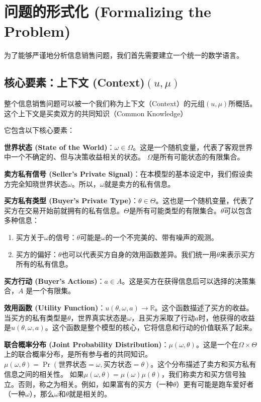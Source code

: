 \section{问题的形式化 (Formalizing the Problem)}

为了能够严谨地分析信息销售问题，我们首先需要建立一个统一的数学语言。

\subsection{核心要素：上下文 (Context)$(u,\mu)$}

整个信息销售问题可以被一个我们称为上下文（Context）的元组$(u, \mu)$所概括。这个上下文是买卖双方的共同知识（Common Knowledge）

它包含以下核心要素：

\textbf{世界状态 (State of the World)}：$\omega \in \Omega$。这是一个随机变量，代表了客观世界中一个不确定的、但与决策收益相关的状态。
$\Omega$是所有可能状态的有限集合。

\textbf{卖方私有信号 (Seller's Private Signal)}：在本模型的基本设定中，我们假设卖方完全知晓世界状态$\omega$。所以，$\omega$就是卖方的私有信息。

\textbf{买方私有类型 (Buyer's Private Type)}：$\theta \in \Theta$。这也是一个随机变量，代表了买方在交易开始前就拥有的私有信息。$\Theta$是所有可能类型的有限集合。$\theta$可以包含多种信息：
\begin{enumerate}
    \item 买方关于$\omega$的信号：$\theta$可能是$\omega$的一个不完美的、带有噪声的观测。
    \item 买方的偏好：$\theta$也可以代表买方自身的效用函数差异。我们统一用$\theta$来表示买方所有的私有信息。
\end{enumerate}

\textbf{买方行动 (Buyer's Actions)}：$a\in A$。这是买方在获得信息后可以选择的决策集合，$A$ 是一个有限集。

\textbf{效用函数 (Utility Function)}：$u(\theta, \omega, a) \to \mathbb{R}$。这个函数描述了买方的收益。当买方的私有类型是$\theta$，世界真实状态是$\omega$，且买方采取了行动$a$时，他获得的收益是$u(\theta, \omega, a)$。这个函数是整个模型的核心，它将信息和行动的价值联系了起来。

\textbf{联合概率分布 (Joint Probability Distribution)}：$\mu(\omega, \theta)$。这是一个在$\Omega \times \Theta$上的联合概率分布，是所有参与者的共同知识。
$\mu(\omega, \theta)= \Pr(\text{世界状态}=\omega, \text{买方状态}=\theta)$。这个分布描述了卖方和买方私有信息之间的相关性。
如果$\mu(\omega,\theta)=\mu(\omega)\mu(\theta)$，我们称卖方和买方信号独立。否则，称之为相关。例如，如果富有的买方（一种$\theta$）更有可能是跑车爱好者（一种$\omega$），那么$\omega$和$\theta$就是相关的。

